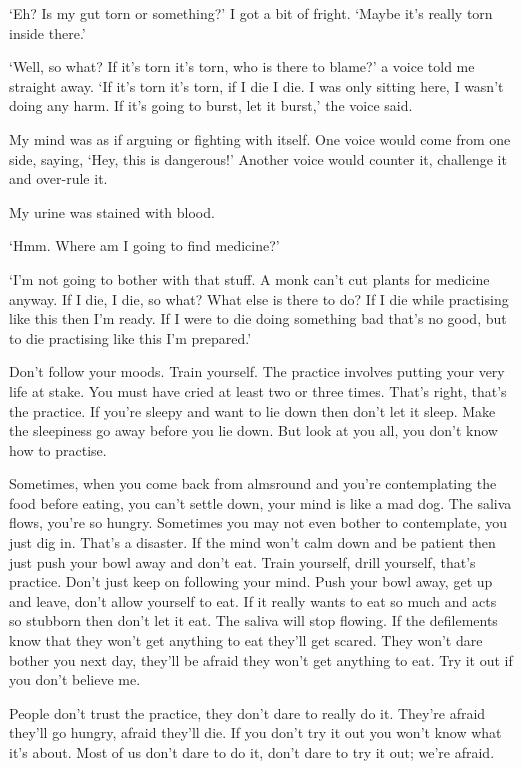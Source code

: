 `Eh? Is my gut torn or something?' I got a bit of fright. `Maybe it's really torn inside there.'

`Well, so what? If it's torn it's torn, who is there to blame?' a voice told me straight away. `If it's torn it's torn, if I die I die. I was only sitting here, I wasn't doing any harm. If it's going to burst, let it burst,' the voice said.

My mind was as if arguing or fighting with itself. One voice would come from one side, saying, `Hey, this is dangerous!' Another voice would counter it, challenge it and over-rule it.

My urine was stained with blood.

`Hmm. Where am I going to find medicine?'

`I'm not going to bother with that stuff. A monk can't cut plants for medicine anyway. If I die, I die, so what? What else is there to do? If I die while practising like this then I'm ready. If I were to die doing something bad that's no good, but to die practising like this I'm prepared.'

Don't follow your moods. Train yourself. The practice involves putting your very life at stake. You must have cried at least two or three times. That's right, that's the practice. If you're sleepy and want to lie down then don't let it sleep. Make the sleepiness go away before you lie down. But look at you all, you don't know how to practise.

Sometimes, when you come back from almsround and you're contemplating the food before eating, you can't settle down, your mind is like a mad dog. The saliva flows, you're so hungry. Sometimes you may not even bother to contemplate, you just dig in. That's a disaster. If the mind won't calm down and be patient then just push your bowl away and don't eat. Train yourself, drill yourself, that's practice. Don't just keep on following your mind. Push your bowl away, get up and leave, don't allow yourself to eat. If it really wants to eat so much and acts so stubborn then don't let it eat. The saliva will stop flowing. If the defilements know that they won't get anything to eat they'll get scared. They won't dare bother you next day, they'll be afraid they won't get anything to eat. Try it out if you don't believe me.

People don't trust the practice, they don't dare to really do it. They're afraid they'll go hungry, afraid they'll die. If you don't try it out you won't know what it's about. Most of us don't dare to do it, don't dare to try it out; we're afraid.


